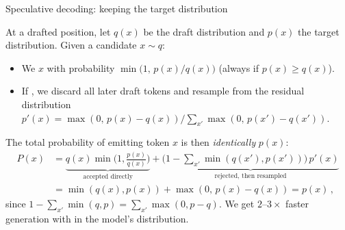 \documentclass[11pt,aspectratio=169]{beamer}
\begin{document}
\begin{frame}{Speculative decoding: keeping the target distribution}
    \small\setlength{\parskip}{4pt}
    \setlength{\abovedisplayskip}{4pt}\setlength{\belowdisplayskip}{4pt}

    At a drafted position, let $q(x)$ be the draft distribution and $p(x)$ the
    target distribution. Given a candidate $x\sim q$:
    \begin{itemize}
        \setlength{\itemsep}{2pt}
        \item We  $x$ with probability
              $\min\!\big(1,\,p(x)/q(x)\big)$ (always if $p(x)\ge q(x)$).
        \item If , we discard all later draft tokens and
              resample from the residual distribution
              $p'(x)=\max(0,\,p(x)-q(x))\big/\sum_{x'}\max(0,\,p(x')-q(x'))$.
    \end{itemize}

    The total probability of emitting token $x$ is then \emph{identically} $p(x)$:
    \[\begin{aligned}
        P(x) &= \underbrace{q(x)\min\!\Big(1,\frac{p(x)}{q(x)}\Big)}_{\text{accepted directly}}
        + \underbrace{\Big(1-\sum_{x'}\min(q(x'),p(x'))\Big)\,p'(x)}_{\text{rejected, then resampled}} \\
        &= \min(q(x),p(x)) + \max(0,\,p(x)-q(x)) = p(x) \,,
    \end{aligned}\]
    since $1-\sum_{x'}\min(q,p)=\sum_{x'}\max(0,p-q)$. We get $2$--$3\times$
    faster generation with  in the model's distribution.


\end{frame}
\end{document}
